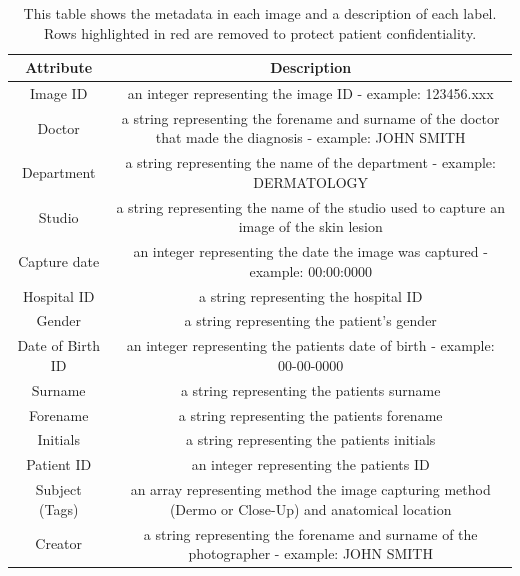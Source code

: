 \begin{table}
	\small
	\begin{tabular}{|c|c|}
		\hline
		Attribute & Description
		\\
		\hline
		Image ID & an integer representing the image ID - example: 123456.xxx
		\\
		\hline
		\rowcolor{red}
		Doctor & a string representing the forename and surname of the doctor that made the diagnosis - example: JOHN SMITH
		\\
		\hline
		\rowcolor{red}
		Department & a string representing the name of the department - example: DERMATOLOGY
		\\
		\hline
		\rowcolor{red}
		Studio & a string representing the name of the studio used to capture an image of the skin lesion
		\\
		\hline
		Capture date & an integer representing the date the image was captured - example: 00:00:0000
		\\
		\hline
		\rowcolor{red}
		Hospital ID & a string representing the hospital ID
		\\
		\hline
		Gender & a string representing the patient's gender
		\\
		\hline
		Date of Birth ID & an integer representing the patients date of birth - example: 00-00-0000
		\\
		\hline
		\rowcolor{red}
		Surname & a string representing the patients surname
		\\
		\hline
		\rowcolor{red}
		Forename & a string representing the patients forename
		\\
		\hline
		\rowcolor{red}
		Initials & a string representing the patients initials
		\\
		\hline
		\rowcolor{red}
		Patient ID & an integer representing the patients ID
		\\
		\hline
		Subject (Tags) & an array representing method the image capturing method (Dermo or Close-Up) and anatomical location
		\\
		\hline
		\rowcolor{red}
		Creator & a string representing the forename and surname of the photographer - example: JOHN SMITH

	\end{tabular}
	\caption{This table shows the metadata in each image and a description of each label. Rows highlighted in red are removed to protect patient confidentiality.}
\end{table} \label{nhs-metadata}                         

